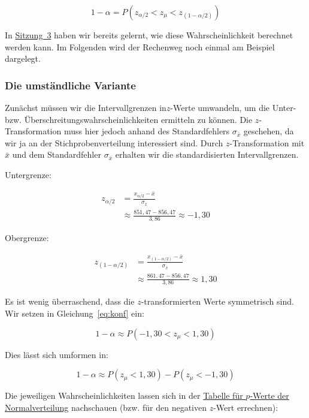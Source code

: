 \documentclass[
  11pt,
  ngerman,
  a4paper,
]{report}
\begin{document}
\[
1-\alpha=P(z_{\alpha/2} < z_{\mu} < z_{(1-\alpha/2)})
\label{eq:konf}
\]

In \protect\hyperlink{wahrscheinlichkeitsrechnung-mit-standardnormalverteilung}{Sitzung~3} haben wir bereits gelernt, wie diese Wahrscheinlichkeit berechnet werden kann. Im Folgenden wird der Rechenweg noch einmal am Beispiel dargelegt.

\hypertarget{die-umstuxe4ndliche-variante}{%
\subsubsection{Die umständliche Variante}\label{die-umstuxe4ndliche-variante}}

Zunächst müssen wir die Intervallgrenzen in\(z\)-Werte umwandeln, um die Unter- bzw. Überschreitungswahrscheinlichkeiten ermitteln zu können. Die \(z\)-Transformation muss hier jedoch anhand des Standardfehlers \(\sigma_{\bar{x}}\) geschehen, da wir ja an der Stichprobenverteilung interessiert sind. Durch \(z\)-Transformation mit \(\bar{x}\) und dem Standardfehler \(\sigma_{\bar{x}}\) erhalten wir die standardisierten Intervallgrenzen.

Untergrenze:

\nopagebreak

\[\begin{aligned}
z_{\alpha/2} &= \frac{x_{\alpha/2}-\bar{x}}{\sigma_{\bar{x}}}\\[4pt]
&\approx\frac{851{,}47-856,47}{3,86}\approx-1,30
\end{aligned}\]

Obergrenze:

\nopagebreak

\[\begin{aligned}
z_{(1-\alpha/2)} &= \frac{x_{(1-\alpha/2)}-\bar{x}}{\sigma_{\bar{x}}}\\[4pt]
&\approx\frac{861{,}47-856,47}{3,86}\approx1,30
\end{aligned}\]

Es ist wenig überraschend, dass die \(z\)-transformierten Werte symmetrisch sind. Wir setzen in Gleichung~\eqref{eq:konf} ein:

\nopagebreak

\[1-\alpha\approx P(-1{,}30 <z_{\mu} < 1{,}30)\]

Dies lässt sich umformen in:

\nopagebreak

\[
1-\alpha\approx P(z_{\mu}<1{,}30) - P(z_{\mu}<-1{,}30) 
\]

Die jeweiligen Wahrscheinlichkeiten lassen sich in der \protect\hyperlink{tabelle-z}{Tabelle für \(p\)-Werte der Normalverteilung} nachschauen (bzw. für den negativen \(z\)-Wert errechnen):
\end{document}

